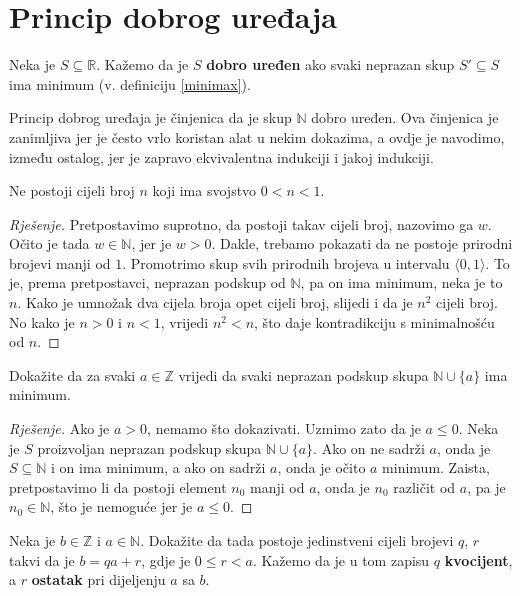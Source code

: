 \section{Princip dobrog uređaja}
\begin{definition}
Neka je $S\subseteq \mathbb{R}$. Kažemo da je $S$ \textbf{dobro uređen} ako svaki neprazan skup $S'\subseteq S$ ima minimum (v. definiciju \ref{minimax}).
\end{definition}
Princip dobrog uređaja je činjenica da je skup $\mathbb{N}$ dobro uređen. Ova činjenica je zanimljiva jer je često vrlo koristan alat u nekim dokazima, a ovdje je navodimo, između ostalog, jer je zapravo ekvivalentna indukciji i jakoj indukciji.
\begin{exercise}
\label{23}
Ne postoji cijeli broj $n$ koji ima svojstvo $0<n<1$.
\end{exercise}
\begin{proof}[Rješenje]
Pretpostavimo suprotno, da postoji takav cijeli broj, nazovimo ga $w$. Očito je tada $w\in \mathbb{N}$, jer je $w>0$. Dakle, trebamo pokazati da ne postoje prirodni brojevi manji od $1$. Promotrimo skup svih prirodnih brojeva u intervalu $\langle 0, 1\rangle$. To je, prema pretpostavci, neprazan podskup od $\mathbb{N}$, pa on ima minimum, neka je to $n$. Kako je umnožak dva cijela broja opet cijeli broj, slijedi i da je $n^2$ cijeli broj. No kako je $n>0$ i $n<1$, vrijedi $n^2<n$, što daje kontradikciju s minimalnošću od $n$.
\end{proof}
\begin{exercise}
\label{24}
Dokažite da za svaki $a\in \mathbb{Z}$ vrijedi da svaki neprazan podskup skupa $\mathbb{N}\cup\{a\}$ ima minimum.
\end{exercise}
\begin{proof}[Rješenje]
Ako je $a>0$, nemamo što dokazivati. Uzmimo zato da je $a\leq 0$. Neka je $S$ proizvoljan neprazan podskup skupa $\mathbb{N}\cup\{a\}$. Ako on ne sadrži $a$, onda je $S\subseteq \mathbb{N}$ i on ima minimum, a ako on sadrži $a$, onda je očito $a$ minimum. Zaista, pretpostavimo li da postoji element $n_0$ manji od $a$, onda je $n_0$ različit od $a$, pa je $n_0\in \mathbb{N}$, što je nemoguće jer je $a\leq 0$.
\end{proof}
\begin{exercise}
Neka je $b\in \mathbb{Z}$ i $a\in \mathbb{N}$. Dokažite da tada postoje jedinstveni cijeli brojevi $q$, $r$ takvi da je $b=qa+r$, gdje je $0\leq r<a$. Kažemo da je u tom zapisu $q$ \textbf{kvocijent}, a $r$ \textbf{ostatak} pri dijeljenju $a$ sa $b$.
\end{exercise}
